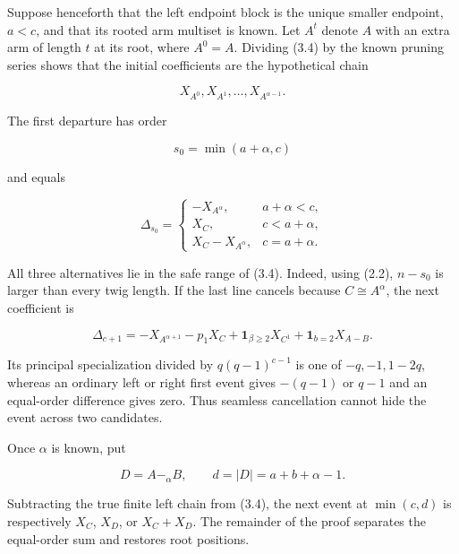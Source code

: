 \documentclass[11pt]{article}
\begin{document}
Suppose henceforth that the left endpoint block is the unique smaller endpoint, $a<c$, and that its
rooted arm multiset is known. Let $A^t$ denote $A$ with an extra arm of length $t$ at its root,
where $A^0=A$. Dividing (3.4) by the known pruning series shows that the initial coefficients are the
hypothetical chain

\begin{equation*}
X_{A^0},X_{A^1},\ldots,X_{A^{\alpha-1}}.
\end{equation*}


The first departure has order

\begin{equation*}
s_0=\min(a+\alpha,c)
\tag{3.5}
\end{equation*}


and equals

\begin{equation*}
\Delta_{s_0}=
\begin{cases}
-X_{A^\alpha},&a+\alpha<c,\\
 X_C,&c<a+\alpha,\\
 X_C-X_{A^\alpha},&c=a+\alpha.
\end{cases}
\tag{3.6}
\end{equation*}


All three alternatives lie in the safe range of (3.4). Indeed, using (2.2), $n-s_0$ is larger
than every twig length. If the last line cancels because $C\cong A^\alpha$, the next coefficient is

\begin{equation*}
\Delta_{c+1}=-X_{A^{\alpha+1}}-p_1X_C
+\mathbf1_{\beta\geq2}X_{C^1}
+\mathbf1_{b=2}X_{A\mathbin{-}B}.
\tag{3.7}
\end{equation*}


Its principal specialization divided by $q(q-1)^{c-1}$ is one of $-q,-1,1-2q$, whereas an
ordinary left or right first event gives $-(q-1)$ or $q-1$ and an equal-order difference gives zero.
Thus seamless cancellation cannot hide the event across two candidates.

Once $\alpha$ is known, put

\begin{equation*}
D=A\mathbin{-}_{\alpha}B,\qquad d=|D|=a+b+\alpha-1.
\tag{3.8}
\end{equation*}


Subtracting the true finite left chain from (3.4), the next event at $\min(c,d)$ is respectively
$X_C$, $X_D$, or $X_C+X_D$. The remainder of the proof separates the equal-order sum and restores
root positions.
\end{document}

